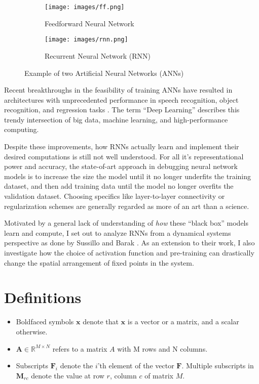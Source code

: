 \documentclass{article} %
\newcommand{\bf}[1]{\mathbf{#1}}
\newcommand{\x}{\bf{x}}
\newcommand{\F}{\bf{F}}
\begin{document}
\begin{figure}
\centering
\begin{subfigure}{.5\textwidth}
  \centering
  \texttt{[image: images/ff.png]}
  \caption{Feedforward Neural Network}
  \label{fig:sub1}
\end{subfigure}%
\begin{subfigure}{.5\textwidth}
  \centering
  \texttt{[image: images/rnn.png]}
  \caption{Recurrent Neural Network (RNN)}
  \label{fig:sub2}
\end{subfigure}
\caption{Example of two Artificial Neural Networks (ANNs)}
\label{fig:test}
\end{figure}

Recent breakthroughs in the feasibility of training ANNs have resulted in architectures with unprecedented performance in speech recognition, object recognition, and regression tasks \cite{NIPS2012_4824}. The term ``Deep Learning'' describes this trendy intersection of big data, machine learning, and high-performance computing.

Despite these improvements, how RNNs actually learn and implement their desired computations is still not well understood. For all it's representational power and accuracy, the state-of-art approach in debugging neural network models is to increase the size the model until it no longer underfits the training dataset, and then add training data until the model no longer overfits the validation dataset. Choosing specifics like layer-to-layer connectivity or regularization schemes are generally regarded as more of an art than a science.

Motivated by a general lack of understanding of \textit{how} these ``black box'' models learn and compute, I set out to analyze RNNs from a dynamical systems perspective as done by Sussillo and Barak \cite{SussilloBarak2014253}. As an extension to their work, I also investigate how the choice of activation function and pre-training can drastically change the spatial arrangement of fixed points in the system.

\section{Definitions}

\begin{itemize}
  \item Boldfaced symbols $\x$ denote that $\x$ is a vector or a matrix, and a scalar otherwise.
  \item $\bf{A} \in \mathbb{R}^{M \times N}$ refers to a matrix $A$ with M rows and N columns.
  \item Subscripts $\F_i$ denote the $i$'th element of the vector $\F$. Multiple subscripts in $\bf{M}_{rc}$ denote the value at row $r$, column $c$ of matrix $M$.

\end{itemize}
\end{document}
